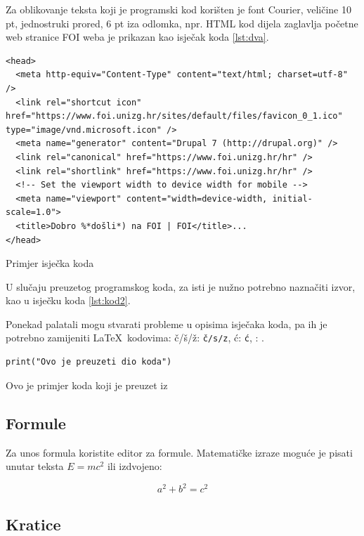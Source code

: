 \documentclass[]{foi}
\begin{document}
Za oblikovanje teksta koji je programski kod korišten je font Courier, veličine 10 pt, jednostruki prored, 6 pt iza odlomka, npr. HTML kod dijela zaglavlja početne web stranice FOI weba je prikazan kao isječak koda \ref{lst:dva}.

\begin{listing}
    \begin{verbatim}
<head>
  <meta http-equiv="Content-Type" content="text/html; charset=utf-8" />
  <link rel="shortcut icon" href="https://www.foi.unizg.hr/sites/default/files/favicon_0_1.ico" type="image/vnd.microsoft.icon" />
  <meta name="generator" content="Drupal 7 (http://drupal.org)" />
  <link rel="canonical" href="https://www.foi.unizg.hr/hr" />
  <link rel="shortlink" href="https://www.foi.unizg.hr/hr" />
  <!-- Set the viewport width to device width for mobile -->
  <meta name="viewport" content="width=device-width, initial-scale=1.0">
  <title>Dobro %*došli*) na FOI | FOI</title>...
</head>
    \end{verbatim}
    \caption{Primjer isječka koda}
    \label{lst:dva}
\end{listing}

U slučaju preuzetog programskog koda, za isti je nužno potrebno naznačiti izvor, kao u isječku koda \ref{lst:kod2}. 

Ponekad palatali mogu stvarati probleme u opisima isječaka koda, pa ih je potrebno zamijeniti \LaTeX\ kodovima: \v{c}/\v{s}/\v{z}: \texttt{\v{c/s/z}}, \'{c}: \texttt{\'{c}}, \dj: \texttt{\dj}.


\begin{listing}
    \begin{verbatim}
print("Ovo je preuzeti dio koda")
    \end{verbatim}
    \caption[Ovo je primjer koda koji je preuzet]{Ovo je primjer koda koji je preuzet iz \cite[str. 23]{russell2022ArtificialIntelligenceModern}}
    \label{lst:kod2}
\end{listing}



\subsection{Formule}

Za unos formula koristite editor za formule. Matematičke izraze moguće je pisati unutar teksta $E = mc^2$ ili izdvojeno:
    
$$
a^2 + b^2 = c^2
$$

\subsection{Kratice}
\end{document}
